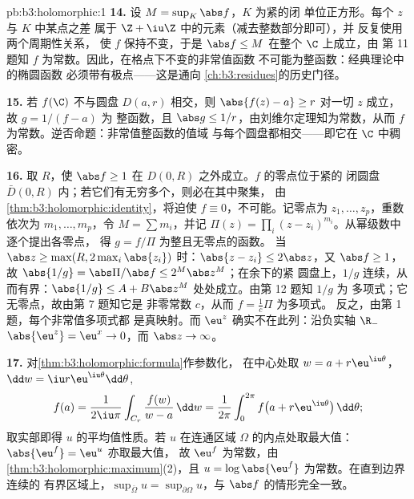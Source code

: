 \begin{solution}{pb:b3:holomorphic:1}
\textbf{14.} 设 $M = \sup_K\abs f$，$K$ 为紧的闭
单位正方形。每个 $z$ 与 $K$ 中某点之差
属于 $\Z + \iu\Z$ 中的元素（减去整数部分即可），并
反复使用两个周期性关系，
使 $f$ 保持不变，于是 $\abs f \leq M$ 在整个 $\C$ 上成立，由
第 11 题知 $f$ 为常数。因此，在格点下不变的非常值函数
不可能为整函数：经典理论中的椭圆函数
必须带有极点——这是通向
\cref{ch:b3:residues}的历史门径。

\textbf{15.} 若 $f(\C)$ 不与圆盘 $D(a, r)$ 相交，则
$\abs{f(z) - a} \geq r$ 对一切 $z$ 成立，故 $g = 1/(f - a)$ 为
整函数，且 $\abs g \leq 1/r$，由刘维尔定理知为常数，从而
$f$ 为常数。逆否命题：非常值整函数的值域
与每个圆盘都相交——即它在 $\C$ 中稠密。

\textbf{16.} 取 $R$，使 $\abs f \geq 1$ 在
$D(0, R)$ 之外成立。$f$ 的零点位于紧的
闭圆盘 $\bar D(0, R)$ 内；若它们有无穷多个，则必在其中聚集，
由\cref{thm:b3:holomorphic:identity}，将迫使 $f
\equiv 0$，不可能。记零点为 $z_1, \dots, z_p$，重数依次为
$m_1, \dots, m_p$，令 $M = \sum m_i$，并记
$\Pi(z) = \prod_i(z - z_i)^{m_i}$。从幂级数中逐个提出各零点，
得 $g = f/\Pi$ 为整且无零点的函数。
当 $\abs z \geq \max(R, 2\max_i\abs{z_i})$ 时：$\abs{z - z_i}
\leq 2\abs z$，又 $\abs f \geq 1$，故 $\abs{1/g} =
\abs\Pi/\abs f \leq 2^M\abs z^M$；在余下的紧
圆盘上，$1/g$ 连续，从而有界：$\abs{1/g} \leq A +
B\abs z^M$ 处处成立。由第 12 题知 $1/g$ 为
多项式；它无零点，故由第 7 题知它是
非零常数 $c$，从而 $f = \frac1c\Pi$ 为多项式。
反之，由第 1 题，每个非常值多项式都
是真映射。而 $\eu^z$ 确实不在此列：沿负实轴 $\R_-$
$\abs{\eu^z} = \eu^x \to 0$，而 $\abs z \to \infty$。

\textbf{17.} 对\cref{thm:b3:holomorphic:formula}作参数化，
在中心处取 $w = a + r\eu^{\iu\theta}$，$\dd w = \iu
r\eu^{\iu\theta}\dd\theta$,
\[
f(a) = \frac1{2\iu\pi}\int_{C_r}\frac{f(w)}{w - a}\,\dd w
= \frac1{2\pi}\int_0^{2\pi}
f\bigl(a + r\eu^{\iu\theta}\bigr)\,\dd\theta ;
\]
取实部即得 $u$ 的平均值性质。若
$u$ 在连通区域
$\Omega$ 的内点处取最大值：$\abs{\eu^f} = \eu^u$ 亦取最大值，
故 $\eu^f$ 为常数，由
\cref{thm:b3:holomorphic:maximum}(2)，且 $u =
\log\abs{\eu^f}$ 为常数。在直到边界连续的
有界区域上，$\sup_{\bar\Omega}u =
\sup_{\partial\Omega}u$，与 $\abs f$ 的情形完全一致。


\end{solution}
